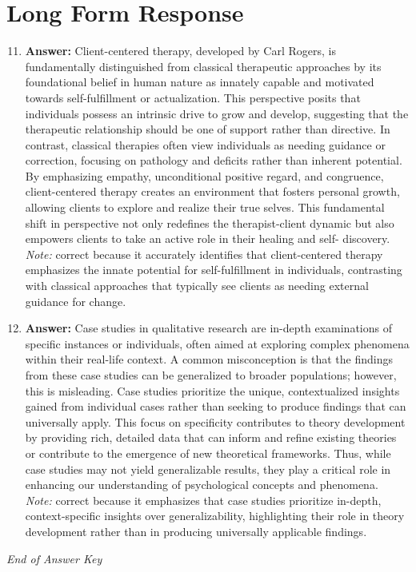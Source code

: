 \documentclass[12pt]{article}
\begin{document}
\section*{Long Form Response}
\begin{enumerate}[label=\arabic*.]
\setcounter{enumi}{10}
\item \textbf{Answer:} Client-centered therapy, developed by Carl Rogers, is fundamentally distinguished from classical therapeutic approaches by its foundational belief in human nature as innately capable and motivated towards self-fulfillment or actualization. This perspective posits that individuals possess an intrinsic drive to grow and develop, suggesting that the therapeutic relationship should be one of support rather than directive. In contrast, classical therapies often view individuals as needing guidance or correction, focusing on pathology and deficits rather than inherent potential. By emphasizing empathy, unconditional positive regard, and congruence, client-centered therapy creates an environment that fosters personal growth, allowing clients to explore and realize their true selves. This fundamental shift in perspective not only redefines the therapist-client dynamic but also empowers clients to take an active role in their healing and self- discovery.
\\ \textit{Note:} correct because it accurately identifies that client-centered therapy emphasizes the innate potential for self-fulfillment in individuals, contrasting with classical approaches that typically see clients as needing external guidance for change.
\item \textbf{Answer:} Case studies in qualitative research are in-depth examinations of specific instances or individuals, often aimed at exploring complex phenomena within their real-life context. A common misconception is that the findings from these case studies can be generalized to broader populations; however, this is misleading. Case studies prioritize the unique, contextualized insights gained from individual cases rather than seeking to produce findings that can universally apply. This focus on specificity contributes to theory development by providing rich, detailed data that can inform and refine existing theories or contribute to the emergence of new theoretical frameworks. Thus, while case studies may not yield generalizable results, they play a critical role in enhancing our understanding of psychological concepts and phenomena.
\\ \textit{Note:} correct because it emphasizes that case studies prioritize in-depth, context-specific insights over generalizability, highlighting their role in theory development rather than in producing universally applicable findings.
\end{enumerate}

\vfill
\noindent\textit{End of Answer Key}
\end{document}
